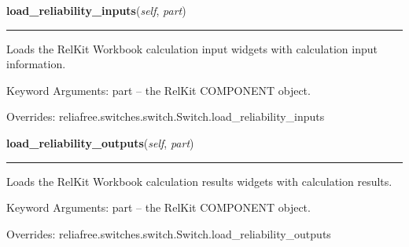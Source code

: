     \vspace{0.5ex}

\hspace{.8\funcindent}\begin{boxedminipage}{\funcwidth}

    \raggedright \textbf{load\_reliability\_inputs}(\textit{self}, \textit{part})

    \vspace{-1.5ex}

    \rule{\textwidth}{0.5\fboxrule}
\setlength{\parskip}{2ex}
    Loads the RelKit Workbook calculation input widgets with calculation
    input information.

    Keyword Arguments: part -- the RelKit COMPONENT object.

\setlength{\parskip}{1ex}
      Overrides: reliafree.switches.switch.Switch.load\_reliability\_inputs

    \end{boxedminipage}

    \vspace{0.5ex}

\hspace{.8\funcindent}\begin{boxedminipage}{\funcwidth}

    \raggedright \textbf{load\_reliability\_outputs}(\textit{self}, \textit{part})

    \vspace{-1.5ex}

    \rule{\textwidth}{0.5\fboxrule}
\setlength{\parskip}{2ex}
    Loads the RelKit Workbook calculation results widgets with 
    calculation results.

    Keyword Arguments: part -- the RelKit COMPONENT object.

\setlength{\parskip}{1ex}
      Overrides: reliafree.switches.switch.Switch.load\_reliability\_outputs

    \end{boxedminipage}

    \label{reliafree:switches:toggle:Toggle:calculate_mil_217_count}

    \vspace{0.5ex}


